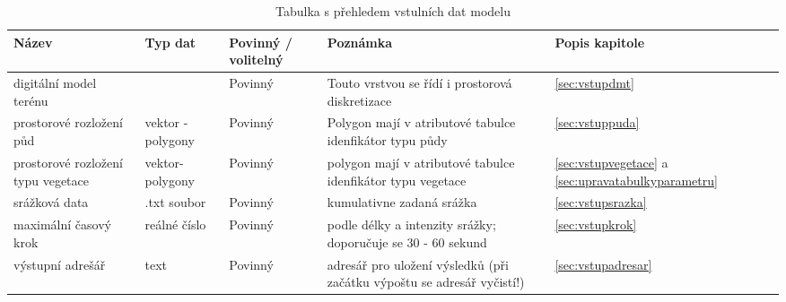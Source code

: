 
% 
\begin{sidewaystable}
\centering
\caption{Tabulka s přehledem vstulních dat modelu}
\label{tab:vstupy}
\small{
\begin{tabular}{p{}lp{}p{}l}
\hline
Název                              & Typ dat                                               & Povinný / volitelný & Poznámka                                                                                      & Popis kapitole                                                       \\ \hline \hline
digitální model terénu             & \cellcolor[HTML]{96FFFB}{\color[HTML]{000000} raster} & Povinný           & Touto vrstvou se řídí i prostorová diskretizace                                                 & \ref{sec:vstupdmt}                                          \\ \hline
prostorové rozložení půd           & \cellcolor[HTML]{FFC702}vektor - polygony             & Povinný           & Polygon mají v atributové tabulce idenfikátor typu půdy                                         & \ref{sec:vstuppuda}                                        \\ \hline
prostorové rozložení typu vegetace & \cellcolor[HTML]{FFC702}vektor- polygony              & Povinný           & polygon mají v atributové tabulce idenfikátor typu vegetace                                     & \ref{sec:vstupvegetace} a \ref{sec:upravatabulkyparametru}   \\ \hline
srážková data                      & .txt soubor                                           & Povinný           & kumulativne zadaná srážka                                                                       &        \ref{sec:vstupsrazka}                                \\ \hline
maximální časový krok              & reálné číslo                                          & Povinný           & podle délky a intenzity srážky; doporučuje se 30 - 60 sekund                                    &    \ref{sec:vstupkrok}                                      \\ \hline
výstupní adrešář                   & text                                                  & Povinný           & adresář pro uložení výsledků (při začátku výpoštu se adresář vyčistí!)                          &    \ref{sec:vstupadresar}                           \\ \hline

\end{tabular}}
\end{sidewaystable}
